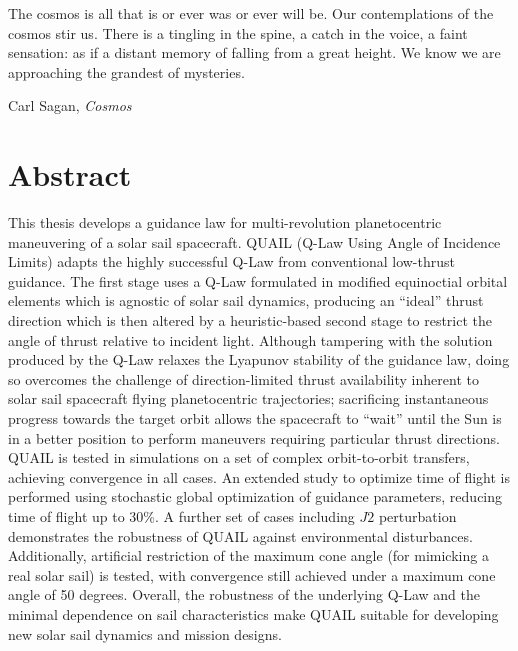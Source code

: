 \begin{titlepage}
  
\end{titlepage}

\epigraph{
  The cosmos is all that is or ever was or ever will be. Our contemplations of the cosmos stir us. There is a tingling in the spine, a catch in the voice, a faint sensation: as if a distant memory of falling from a great height. We know we are approaching the grandest of mysteries.}{Carl Sagan, \textit{Cosmos}}

\newpage

\vspace*{\fill}
\section*{Abstract}
This thesis develops a guidance law for multi-revolution planetocentric maneuvering of a solar sail spacecraft. QUAIL (Q-Law Using Angle of Incidence Limits) adapts the highly successful Q-Law from conventional low-thrust guidance. The first stage uses a Q-Law formulated in modified equinoctial orbital elements which is agnostic of solar sail dynamics, producing an ``ideal'' thrust direction which is then altered by a heuristic-based second stage to restrict the angle of thrust relative to incident light. Although tampering with the solution produced by the Q-Law relaxes the Lyapunov stability of the guidance law, doing so overcomes the challenge of direction-limited thrust availability inherent to solar sail spacecraft flying planetocentric trajectories; sacrificing instantaneous progress towards the target orbit allows the spacecraft to ``wait'' until the Sun is in a better position to perform maneuvers requiring particular thrust directions. QUAIL is tested in simulations on a set of complex orbit-to-orbit transfers, achieving convergence in all cases. An extended study to optimize time of flight is performed using stochastic global optimization of guidance parameters, reducing time of flight up to 30\%. A further set of cases including \(J2\) perturbation demonstrates the robustness of QUAIL against environmental disturbances. Additionally, artificial restriction of the maximum cone angle (for mimicking a real solar sail) is tested, with convergence still achieved under a maximum cone angle of 50 degrees. Overall, the robustness of the underlying Q-Law and the minimal dependence on sail characteristics make QUAIL suitable for developing new solar sail dynamics and mission designs.
\vspace*{\fill}

